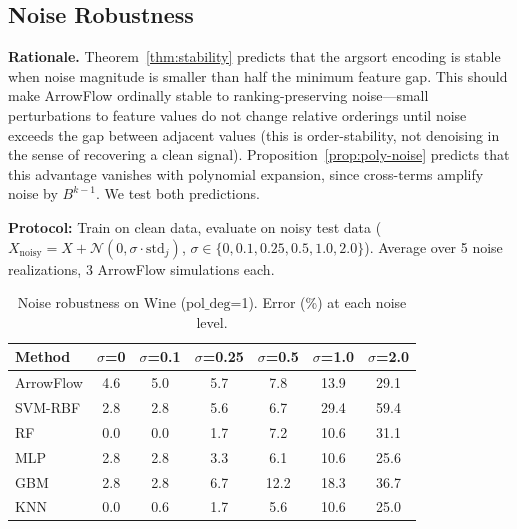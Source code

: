\documentclass[12pt]{article}
\begin{document}
\subsection{Noise Robustness}
\label{sec:noise}

\textbf{Rationale.} Theorem~\ref{thm:stability} predicts that the argsort encoding is stable when noise magnitude is smaller than half the minimum feature gap. This should make ArrowFlow ordinally stable to ranking-preserving noise---small perturbations to feature values do not change relative orderings until noise exceeds the gap between adjacent values (this is order-stability, not denoising in the sense of recovering a clean signal). Proposition~\ref{prop:poly-noise} predicts that this advantage vanishes with polynomial expansion, since cross-terms amplify noise by $B^{k-1}$. We test both predictions.

\textbf{Protocol:} Train on clean data, evaluate on noisy test data ($X_{\mathrm{noisy}} = X + \mathcal{N}(0, \sigma \cdot \mathrm{std}_j)$, $\sigma \in \{0, 0.1, 0.25, 0.5, 1.0, 2.0\}$). Average over 5 noise realizations, 3 ArrowFlow simulations each.

\begin{table}[ht]
\centering
\caption{Noise robustness on Wine ($\mathrm{pol\_deg}$=1). Error (\%) at each noise level.}
\label{tab:noise-wine}
\small
\begin{tabular}{lcccccc}
\toprule
Method & $\sigma$=0 & $\sigma$=0.1 & $\sigma$=0.25 & $\sigma$=0.5 & $\sigma$=1.0 & $\sigma$=2.0 \\
\midrule
ArrowFlow   & 4.6 & 5.0  & 5.7  & 7.8  & 13.9 & 29.1 \\
SVM-RBF     & 2.8 & 2.8  & 5.6  & 6.7  & 29.4 & 59.4 \\
RF          & 0.0 & 0.0  & 1.7  & 7.2  & 10.6 & 31.1 \\
MLP         & 2.8 & 2.8  & 3.3  & 6.1  & 10.6 & 25.6 \\
GBM     & 2.8 & 2.8  & 6.7  & 12.2 & 18.3 & 36.7 \\
KNN         & 0.0 & 0.6  & 1.7  & 5.6  & 10.6 & 25.0 \\
\bottomrule
\end{tabular}
\end{table}
\end{document}
